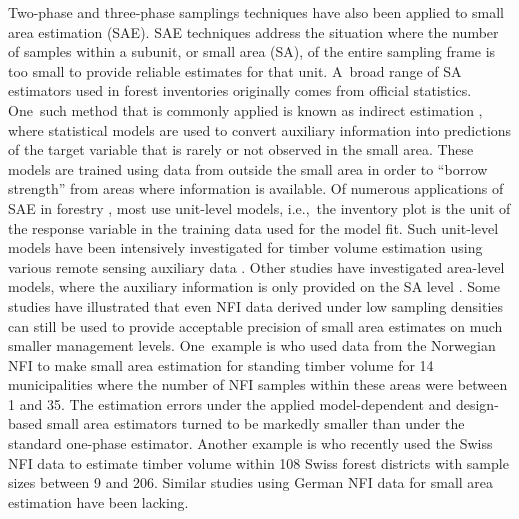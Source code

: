 \documentclass[remotesensing,article,accept,moreauthors,pdftex,10pt,a4paper]{Definitions/mdpi}
\begin{document}
Two-phase and three-phase samplings techniques have also been applied to small area estimation (SAE). SAE techniques address the situation where the number of samples within a subunit, or small area (SA), of the entire sampling frame is too small to provide reliable estimates for that unit. A~broad range of SA estimators used in forest inventories \citep{kohl2006} originally comes from official statistics. One~such method that is commonly applied is known as indirect estimation \citep{rao2015}, where statistical models are used to convert auxiliary information into predictions of the target variable that is rarely or not observed in the small area. These models are trained using data from outside the small area in order to ``borrow strength'' from areas where information is available. Of numerous applications of SAE in forestry \citep{breidenbach2012, goerndt2011, steinmann2013, mandallaz2013b}, most use unit-level models, i.e.,~the inventory plot is the unit of the response variable in the training data used for the model fit. Such unit-level models have been intensively investigated for timber volume estimation using various remote sensing auxiliary data \citep{koch2010, naesset2014inmaltamo}. Other studies have investigated area-level models, where the auxiliary information is only provided on the SA level \citep{magnussen2017}. Some studies have illustrated that even NFI data derived under low sampling densities can still be used to provide acceptable precision of small area estimates on much smaller management levels. One~example is \citet{breidenbach2012} who used data from the Norwegian NFI to make small area estimation for standing timber volume for 14 municipalities where the number of NFI samples within these areas were between 1 and 35. The estimation errors under the applied model-dependent and design-based small area estimators turned to be markedly smaller than under the standard one-phase estimator. Another example is \citet{magnussen2014} who recently used the Swiss NFI data to estimate timber volume within 108 Swiss forest districts with sample sizes between 9 and 206. Similar studies using German NFI data for small area estimation have been lacking.\par
\end{document}

